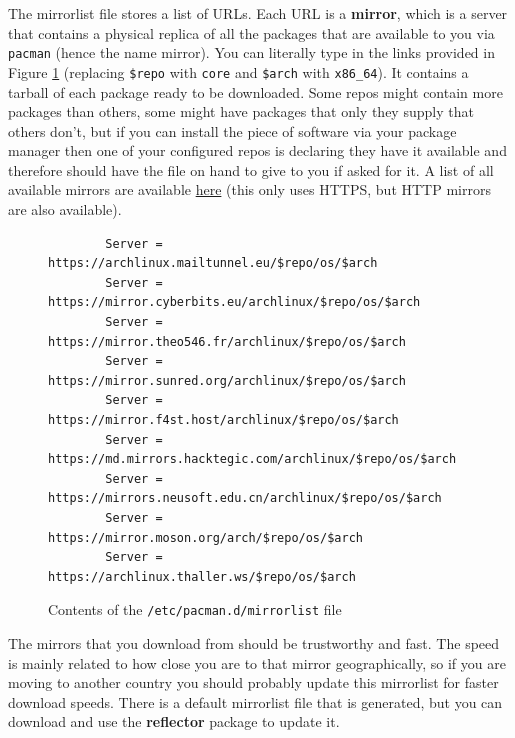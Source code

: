     The mirrorlist file stores a list of URLs. Each URL is a \textbf{mirror}, which is a server that contains a physical replica of all the packages that are available to you via \texttt{pacman} (hence the name mirror). You can literally type in the links provided in Figure \ref{fig:mirrorlist} (replacing \texttt{\$repo} with \texttt{core} and \texttt{\$arch} with \texttt{x86\_64}). It contains a tarball of each package ready to be downloaded. Some repos might contain more packages than others, some might have packages that only they supply that others don’t, but if you can install the piece of software via your package manager then one of your configured repos is declaring they have it available and therefore should have the file on hand to give to you if asked for it. A list of all available mirrors are available \href{https://archlinux.org/mirrorlist/all/https/}{here} (this only uses HTTPS, but HTTP mirrors are also available).  

    \begin{figure}
      \begin{lstlisting}
        Server = https://archlinux.mailtunnel.eu/$repo/os/$arch
        Server = https://mirror.cyberbits.eu/archlinux/$repo/os/$arch
        Server = https://mirror.theo546.fr/archlinux/$repo/os/$arch
        Server = https://mirror.sunred.org/archlinux/$repo/os/$arch
        Server = https://mirror.f4st.host/archlinux/$repo/os/$arch
        Server = https://md.mirrors.hacktegic.com/archlinux/$repo/os/$arch
        Server = https://mirrors.neusoft.edu.cn/archlinux/$repo/os/$arch
        Server = https://mirror.moson.org/arch/$repo/os/$arch
        Server = https://archlinux.thaller.ws/$repo/os/$arch
      \end{lstlisting}
      \caption{Contents of the \texttt{/etc/pacman.d/mirrorlist} file}\label{fig:mirrorlist}
    \end{figure}
    
    The mirrors that you download from should be trustworthy and fast. The speed is mainly related to how close you are to that mirror geographically, so if you are moving to another country you should probably update this mirrorlist for faster download speeds. There is a default mirrorlist file that is generated, but you can download and use the \textbf{reflector} package to update it.  

